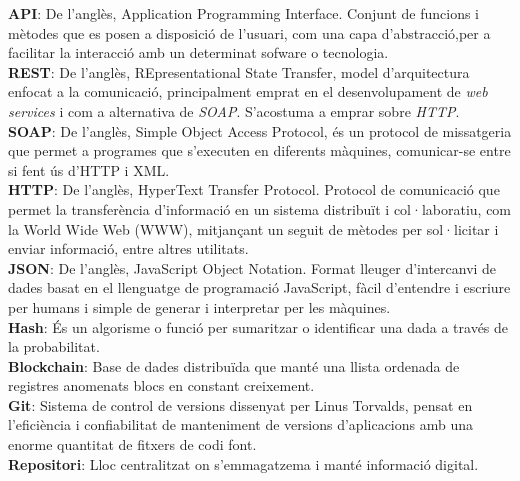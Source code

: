 \noindent
\textbf{API}: De l'anglès, Application Programming Interface. Conjunt de funcions i mètodes que es posen a disposició de l'usuari, com una capa d'abstracció,per a facilitar la interacció amb un determinat sofware o tecnologia.\\
\newline \textbf{REST}: De l'anglès, REpresentational State Transfer, model d'arquitectura enfocat a la comunicació, principalment emprat en el desenvolupament de \textit{web services} i com a alternativa de \textit{SOAP}. S'acostuma a emprar sobre \textit{HTTP}.\\
\newline \textbf{SOAP}: De l'anglès, Simple Object Access Protocol, és un protocol de missatgeria que permet a programes que s'executen en diferents màquines, comunicar-se entre si fent ús d'HTTP i XML.\\
\newline \textbf{HTTP}: De l'anglès, HyperText Transfer Protocol. Protocol de comunicació que permet la transferència d'informació en un sistema distribuït i col·laboratiu, com la World Wide Web (WWW), mitjançant un seguit de mètodes per sol·licitar i enviar informació, entre altres utilitats.\\
\newline \textbf{JSON}: De l'anglès, JavaScript Object Notation. Format lleuger d'intercanvi de dades basat en el llenguatge de programació JavaScript, fàcil d'entendre i escriure per humans i simple de generar i interpretar per les màquines.\\
\newline \textbf{Hash}: És un algorisme o funció per sumaritzar o identificar una dada a través de la probabilitat.\\
\newline \textbf{Blockchain}: Base de dades distribuïda que manté una llista ordenada de registres anomenats blocs en constant creixement.\\
\newline \textbf{Git}: Sistema de control de versions dissenyat per Linus Torvalds, pensat en l'eficiència i confiabilitat de manteniment de versions d'aplicacions amb una enorme quantitat de fitxers de codi font.\\
\newline \textbf{Repositori}: Lloc centralitzat on s'emmagatzema i manté informació digital.\\
